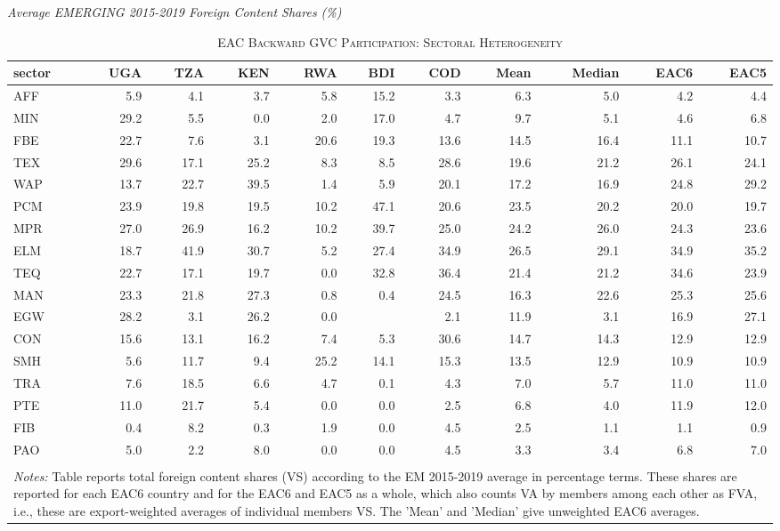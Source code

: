 \documentclass[a4paper]{article}
\begin{document}
\begin{table}[ht!] 
\centering
\caption{\label{tab:EACVB_sec}\textsc{EAC Backward GVC Participation: Sectoral Heterogeneity}}
\small{\textit{Average EMERGING 2015-2019 Foreign Content Shares (\%)}} \\
\vspace{1mm}
\begin{tabular}{lrrrrrrrrrr}
  \toprule
sector & UGA & TZA & KEN & RWA & BDI & COD & Mean & Median & EAC6 & EAC5 \\ 
  \midrule
AFF & 5.9 & 4.1 & 3.7 & 5.8 & 15.2 & 3.3 & 6.3 & 5.0 & 4.2 & 4.4\\ 
  MIN & 29.2 & 5.5 & 0.0 & 2.0 & 17.0 & 4.7 & 9.7 & 5.1 & 4.6 & 6.8\\ 
  FBE & 22.7 & 7.6 & 3.1 & 20.6 & 19.3 & 13.6 & 14.5 & 16.4 & 11.1 & 10.7\\ 
  TEX & 29.6 & 17.1 & 25.2 & 8.3 & 8.5 & 28.6 & 19.6 & 21.2 & 26.1 & 24.1\\ 
  WAP & 13.7 & 22.7 & 39.5 & 1.4 & 5.9 & 20.1 & 17.2 & 16.9 & 24.8 & 29.2\\ 
  PCM & 23.9 & 19.8 & 19.5 & 10.2 & 47.1 & 20.6 & 23.5 & 20.2 & 20.0 & 19.7\\ 
  MPR & 27.0 & 26.9 & 16.2 & 10.2 & 39.7 & 25.0 & 24.2 & 26.0 & 24.3 & 23.6\\ 
  ELM & 18.7 & 41.9 & 30.7 & 5.2 & 27.4 & 34.9 & 26.5 & 29.1 & 34.9 & 35.2\\ 
  TEQ & 22.7 & 17.1 & 19.7 & 0.0 & 32.8 & 36.4 & 21.4 & 21.2 & 34.6 & 23.9\\ 
  MAN & 23.3 & 21.8 & 27.3 & 0.8 & 0.4 & 24.5 & 16.3 & 22.6 & 25.3 & 25.6\\ 
  EGW & 28.2 & 3.1 & 26.2 & 0.0 &  & 2.1 & 11.9 & 3.1 & 16.9 & 27.1\\ 
  CON & 15.6 & 13.1 & 16.2 & 7.4 & 5.3 & 30.6 & 14.7 & 14.3 & 12.9 & 12.9\\ 
  SMH & 5.6 & 11.7 & 9.4 & 25.2 & 14.1 & 15.3 & 13.5 & 12.9 & 10.9 & 10.9\\ 
  TRA & 7.6 & 18.5 & 6.6 & 4.7 & 0.1 & 4.3 & 7.0 & 5.7 & 11.0 & 11.0\\ 
  PTE & 11.0 & 21.7 & 5.4 & 0.0 & 0.0 & 2.5 & 6.8 & 4.0 & 11.9 & 12.0\\ 
  FIB & 0.4 & 8.2 & 0.3 & 1.9 & 0.0 & 4.5 & 2.5 & 1.1 & 1.1 & 0.9\\ 
  PAO & 5.0 & 2.2 & 8.0 & 0.0 & 0.0 & 4.5 & 3.3 & 3.4 & 6.8 & 7.0\\ 
   \bottomrule  \\ [-0.9em]
\multicolumn{11}{l}{\parbox{0.85\textwidth}{\scriptsize
\textit{Notes:} Table reports total foreign content shares (VS) according to the EM 2015-2019 average in percentage terms. These shares are reported for each EAC6 country and for the EAC6 and EAC5 as a whole, which also counts VA by members among each other as FVA, i.e., these are export-weighted averages of individual members VS. The 'Mean' and 'Median' give unweighted EAC6 averages.}}
\end{tabular}
\end{table}
\end{document}
